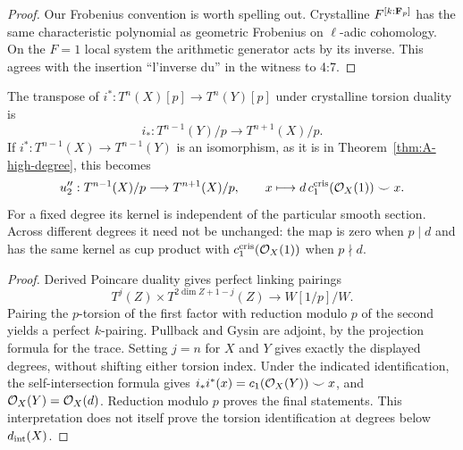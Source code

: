 \begin{proof}
Our Frobenius convention is worth spelling out.  Crystalline
$F^{[k:\mathbf F_p]}$ has the same characteristic polynomial as geometric
Frobenius on $\ell$-adic cohomology.  On the $F=1$ local system the
arithmetic generator acts by its inverse.  This agrees with the
insertion ``l'inverse du'' in the witness to 4:7.
\end{proof}

\begin{proposition}\label{prop:A-transpose-u2}
 The transpose of
$i^*:T^n(X)[p]\to T^n(Y)[p]$ under crystalline torsion duality is
\[
i_*:T^{n-1}(Y)/p\longrightarrow T^{n+1}(X)/p.
\]
If $i^*:T^{n-1}(X)\to T^{n-1}(Y)$ is an isomorphism, as it is in
Theorem~\ref{thm:A-high-degree}, this becomes
\[
 u_2'':T^{n-1}(X)/p\longrightarrow T^{n+1}(X)/p,
 \qquad x\longmapsto d\,c_1^{\mathrm{cris}}(\mathcal O_X(1))\smile x.
\]
For a fixed degree its kernel is independent of the particular smooth
section.  Across different degrees it need not be unchanged: the map
is zero when $p\mid d$ and has the same kernel as cup product with
$c_1^{\mathrm{cris}}(\mathcal O_X(1))$ when $p\nmid d$.
\end{proposition}
\begin{proof}
Derived Poincare duality gives perfect linking pairings
\[
 T^j(Z)\times T^{2\dim Z+1-j}(Z)\longrightarrow W[1/p]/W.
\]
Pairing the $p$-torsion of the first factor with reduction modulo $p$
of the second yields a perfect $k$-pairing.  Pullback and Gysin are
adjoint, by the projection formula for the trace.  Setting $j=n$ for
$X$ and $Y$ gives exactly the displayed degrees, without shifting
either torsion index.  Under the indicated identification, the
self-intersection formula gives $i_*i^*(x)=c_1(\mathcal O_X(Y))\smile x$,
and $\mathcal O_X(Y)=\mathcal O_X(d)$.  Reduction modulo $p$ proves the final
statements.  This interpretation does not itself prove the torsion
identification at degrees below $d_{\rm int}(X)$.
\end{proof}

